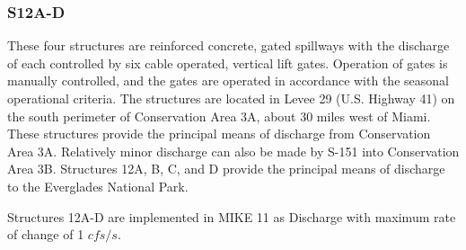 \clearpage
\subsubsection{S12A-D}

These four structures are reinforced concrete, gated spillways with the discharge of each controlled by six cable operated, vertical lift gates. Operation of gates is manually controlled, and the gates are operated in accordance with the seasonal operational criteria. The structures are located in Levee 29 (U.S. Highway 41) on the south perimeter of Conservation Area 3A, about 30 miles west of Miami. These structures provide the principal means of discharge from Conservation Area 3A. Relatively minor discharge can also be made by S-151 into Conservation Area 3B. Structures 12A, B, C, and D provide the principal means of discharge to the Everglades National Park.

Structures 12A-D are implemented in MIKE 11 as Discharge with maximum rate of change of 1 $cfs/s$.

%
%

